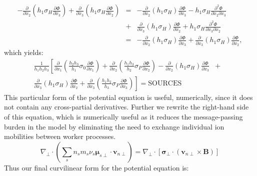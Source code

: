 \documentclass[11pt,letterpaper]{article}
\begin{document}
\begin{eqnarray}
-\frac{\partial}{\partial x_2} \left( h_1 \sigma_H \frac{\partial \Phi}{\partial x_3} \right) + \frac{\partial}{\partial x_3} \left( h_1 \sigma_H \frac{\partial \Phi}{\partial x_2} \right) &=& -\frac{\partial}{\partial x_2} \left( h_1 \sigma_H \right) \frac{\partial \Phi}{\partial x_3} - h_1 \sigma_H \frac{\partial^2 \Phi}{\partial x_2 \partial x_3} \\ &+& \frac{\partial}{\partial x_3} \left( h_1 \sigma_H \right) \frac{\partial \Phi}{\partial x_2} + h_1 \sigma_H \frac{\partial^2 \Phi}{\partial x_3 \partial x_2} \nonumber \\ &=& -\frac{\partial}{\partial x_2} \left( h_1 \sigma_H \right) \frac{\partial \Phi}{\partial x_3} + \frac{\partial}{\partial x_3} \left( h_1 \sigma_H \right) \frac{\partial \Phi}{\partial x_2}, 
\end{eqnarray}
which yields:
\begin{eqnarray}
\frac{1}{h_1 h_2 h_3} \left[ \frac{\partial}{\partial x_1} \left( \frac{h_2 h_3}{h_1} \sigma_0 \frac{\partial \Phi}{\partial x_1} \right) + \frac{\partial}{\partial x_2} \left( \frac{h_1 h_3}{h_2} \sigma_P \frac{\partial \Phi}{\partial x_2} \right) -  \right. \frac{\partial}{\partial x_2} \left( h_1 \sigma_H \right) \frac{\partial \Phi}{\partial x_3} &+& \nonumber \\ \left. \frac{\partial}{\partial x_3} \left( h_1 \sigma_H \right) \frac{\partial \Phi}{\partial x_2} + \frac{\partial}{\partial x_3} \left( \frac{h_1 h_2}{h_3} \sigma_P \frac{\partial \Phi}{\partial x_3} \right)
\right]  = \mathrm{SOURCES} 
\end{eqnarray}
This particular form of the potential equation is useful, numerically, since it does not contain any cross-partial derivatives.  Further we rewrite the right-hand side of this equation, which is numerically useful as it reduces the message-passing burden in the model by eliminating the need to exchange individual ion mobilities between worker processes.
\begin{equation}
\nabla_\perp \cdot \left( \sum_s n_s m_s \nu_s \boldsymbol{\mu}_{s\perp} \cdot \mathbf{v}_{n\perp} \right) = \nabla_\perp \cdot \left[ \boldsymbol{\sigma}_\perp \cdot \left( \mathbf{v}_{n\perp} \times \mathbf{B} \right) \right]
\end{equation}
Thus our final curvilinear form for the potential equation is:
\end{document}

